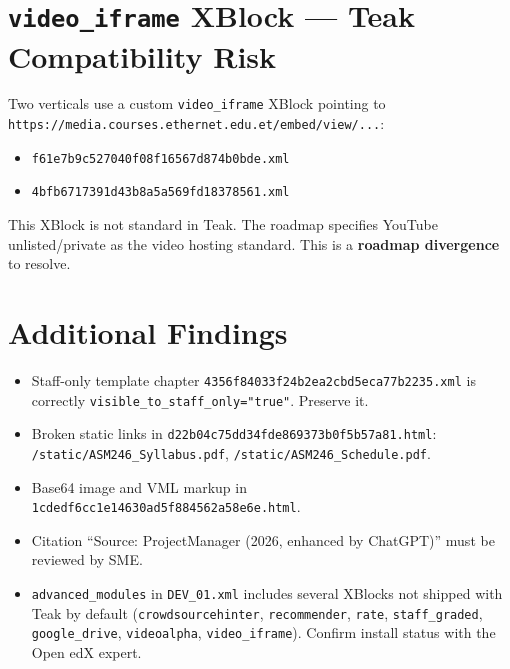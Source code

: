 \section{\texttt{video\_iframe} XBlock — Teak Compatibility Risk}

Two verticals use a custom \texttt{video\_iframe} XBlock pointing to
\texttt{https://media.courses.ethernet.edu.et/embed/view/...}:

\begin{itemize}
  \item \texttt{f61e7b9c527040f08f16567d874b0bde.xml}
  \item \texttt{4bfb6717391d43b8a5a569fd18378561.xml}
\end{itemize}

This XBlock is not standard in Teak. The roadmap specifies YouTube
unlisted/private as the video hosting standard. This is a
\textbf{roadmap divergence} to resolve.

\section{Additional Findings}

\begin{itemize}
  \item Staff-only template chapter
        \texttt{4356f84033f24b2ea2cbd5eca77b2235.xml} is correctly
        \texttt{visible\_to\_staff\_only="true"}. Preserve it.
  \item Broken static links in
        \texttt{d22b04c75dd34fde869373b0f5b57a81.html}:
        \texttt{/static/ASM246\_Syllabus.pdf},
        \texttt{/static/ASM246\_Schedule.pdf}.
  \item Base64 image and VML markup in
        \texttt{1cdedf6cc1e14630ad5f884562a58e6e.html}.
  \item Citation ``Source: ProjectManager (2026, enhanced by ChatGPT)''
        must be reviewed by SME.
  \item \texttt{advanced\_modules} in \texttt{DEV\_01.xml} includes
        several XBlocks not shipped with Teak by default
        (\texttt{crowdsourcehinter}, \texttt{recommender}, \texttt{rate},
        \texttt{staff\_graded}, \texttt{google\_drive}, \texttt{videoalpha},
        \texttt{video\_iframe}). Confirm install status with the Open edX
        expert.
\end{itemize}